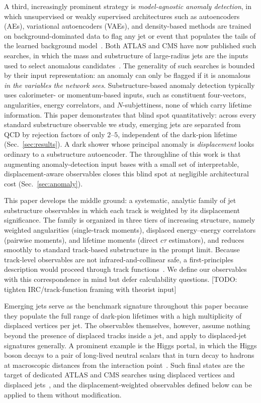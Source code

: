 \documentclass[a4paper,11pt]{article}
\newcommand{\todo}[1]{{\color{red!70!black}[TODO: #1]}}
\newcommand{\ctau}{c\tau}
\begin{document}
A third, increasingly prominent strategy is \emph{model-agnostic
anomaly detection}, in which unsupervised or weakly supervised
architectures such as autoencoders (AEs), variational autoencoders
(VAEs), and density-based methods are trained on background-dominated
data to flag any jet or
event that populates the tails of the learned background
model~\cite{Farina:2018fyg,Heimel:2018mkt,Kasieczka:2021xcg,ATLAS:dijetAD}.
Both ATLAS and CMS have now published such searches, in which the mass
and substructure of large-radius jets are the inputs used to select
anomalous
candidates~\cite{ATLAS:HiggsAD,ATLAS:dijetWeak,CMS:anomalousJets}.
The generality of such searches is bounded by their input
representation: an anomaly can only be flagged if it is anomalous
\emph{in the variables the network sees}. Substructure-based anomaly
detection typically uses calorimeter- or momentum-based inputs, such
as constituent four-vectors, angularities, energy correlators, and
$N$-subjettiness, none of which carry lifetime information. This
paper demonstrates that blind spot quantitatively: across every
standard substructure observable we study, emerging jets are separated
from QCD by rejection factors of only $2$--$5$, independent of the
dark-pion lifetime (Sec.~\ref{sec:results}). A dark shower whose
principal anomaly is \emph{displacement} looks ordinary to a
substructure autoencoder. The throughline of this work is that
augmenting anomaly-detection input bases with a small set of
interpretable, displacement-aware observables closes this blind spot
at negligible architectural cost (Sec.~\ref{sec:anomaly}).

This paper develops the middle ground: a systematic, analytic family of
jet substructure observables in which each track is weighted by its
displacement significance. The family is organized in three tiers of
increasing structure, namely weighted angularities (single-track
moments), displaced energy--energy correlators (pairwise moments), and
lifetime moments (direct $\ctau$ estimators), and reduces smoothly to standard
track-based substructure in the prompt limit. Because track-level
observables are not infrared-and-collinear safe, a first-principles
description would proceed through track
functions~\cite{Chang:2013rca,Li:2021zcf}. We define our observables
with this correspondence in mind but defer calculability questions.
\todo{tighten IRC/track-function framing with theorist input}

Emerging jets serve as the benchmark signature throughout this paper
because they populate the full range of dark-pion lifetimes with a
high multiplicity of displaced vertices per jet. The observables
themselves, however, assume nothing beyond the presence of displaced
tracks inside a jet, and apply to displaced-jet signatures generally.
A prominent example is the Higgs portal, in which the Higgs boson
decays to a pair of long-lived neutral scalars that in turn decay to
hadrons at macroscopic distances from the interaction
point~\cite{Strassler:2006ri,Curtin:2013fra}. Such final states are
the target of dedicated ATLAS and CMS searches using displaced
vertices and displaced jets~\cite{ATLAS:LLPID,CMS:LLPjets}, and the
displacement-weighted observables defined below can be applied to them
without modification.
\end{document}
